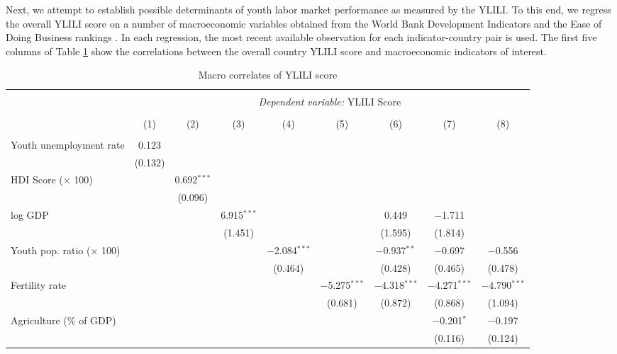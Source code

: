 \documentclass[
  a4paper, twoside, 12pt]{book}
\begin{document}
Next, we attempt to establish possible determinants of youth labor market performance as measured by the YLILI. To this end, we regress the overall YLILI score on a number of macroeconomic variables obtained from the World Bank Development Indicators \autocite{worldbank2021b} and the Ease of Doing Business rankings \autocite{worldbank2021a}. In each regression, the most recent available observation for each indicator-country pair is used. The first five columns of Table \ref{tab:tbl-macrocorr} show the correlations between the overall country YLILI score and macroeconomic indicators of interest.

\begin{singlespace}

\begin{table}[H] \centering 
  \caption{Macro correlates of YLILI score} 
  \label{tab:tbl-macrocorr} 
\scriptsize 
\begin{tabular}{@{\extracolsep{-5pt}}lcccccccc} 
\\[-1.8ex]\hline 
\hline \\[-1.8ex] 
 & \multicolumn{8}{c}{\textit{Dependent variable:} YLILI Score} \\ 
\cline{2-9} 
\\[-1.8ex] & (1) & (2) & (3) & (4) & (5) & (6) & (7) & (8)\\ 
\hline \\[-1.8ex] 
 Youth unemployment rate & 0.123 &  &  &  &  &  &  &  \\ 
  & (0.132) &  &  &  &  &  &  &  \\ 
  HDI Score ($\times$ 100) &  & 0.692$^{***}$ &  &  &  &  &  &  \\ 
  &  & (0.096) &  &  &  &  &  &  \\ 
  log GDP &  &  & 6.915$^{***}$ &  &  & 0.449 & $-$1.711 &  \\ 
  &  &  & (1.451) &  &  & (1.595) & (1.814) &  \\ 
  Youth pop. ratio ($\times$ 100) &  &  &  & $-$2.084$^{***}$ &  & $-$0.937$^{**}$ & $-$0.697 & $-$0.556 \\ 
  &  &  &  & (0.464) &  & (0.428) & (0.465) & (0.478) \\ 
  Fertility rate &  &  &  &  & $-$5.275$^{***}$ & $-$4.318$^{***}$ & $-$4.271$^{***}$ & $-$4.790$^{***}$ \\ 
  &  &  &  &  & (0.681) & (0.872) & (0.868) & (1.094) \\ 
  Agriculture (\% of GDP) &  &  &  &  &  &  & $-$0.201$^{*}$ & $-$0.197 \\ 
  &  &  &  &  &  &  & (0.116) & (0.124) \\ 

\end{tabular}
\end{table}
\end{singlespace}
\end{document}
